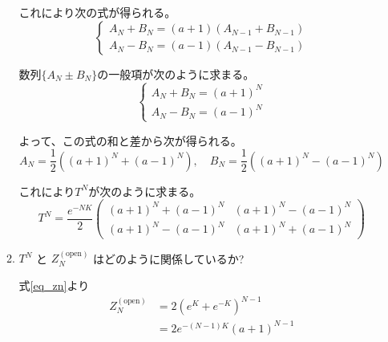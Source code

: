 \documentclass[12pt,b5paper]{ltjsarticle}
\begin{document}
\begin{enumerate}
\begin{enumerate}
      これにより次の式が得られる。
      \begin{equation}
       \begin{cases}
        A_{N}+ B_{N} = (a+1) (A_{N-1}+ B_{N-1})\\
        A_{N}- B_{N} = (a-1) \left( A_{N-1}- B_{N-1} \right)
       \end{cases}
      \end{equation}

      数列$\{A_{N} \pm B_{N}\}$の一般項が次のように求まる。
      \begin{equation}
       \begin{cases}
        A_{N}+ B_{N} = (a+1)^{N} \\
        A_{N}- B_{N} = (a-1)^{N}
       \end{cases}
      \end{equation}
      
      よって、この式の和と差から次が得られる。
      \begin{equation}
       A_{N} = \frac{1}{2}\left( (a+1)^{N} + (a-1)^{N} \right)
        ,\quad
       B_{N} = \frac{1}{2}\left( (a+1)^{N} - (a-1)^{N} \right)
      \end{equation}

      これにより$T^{N}$が次のように求まる。
      \begin{equation}
       T^{N} =
        \frac{e^{-NK}}{2}
        \begin{pmatrix}
         (a+1)^{N} + (a-1)^{N} & (a+1)^{N} - (a-1)^{N} \\
         (a+1)^{N} - (a-1)^{N} & (a+1)^{N} + (a-1)^{N}
        \end{pmatrix}
        \label{eq_tn}
      \end{equation}

      \hrulefill

       \item

            $T^{N}$
            と
            $Z^{(\mathrm{open})}_{N}$
            はどのように関係しているか?

            \dotfill

            式\eqref{eq_zn}より
            \begin{align}
             Z^{(\mathrm{open})}_{N}
              &= 2 (e^{K} + e^{-K})^{N-1}\\
              &= 2 e^{-(N-1)K} (a + 1)^{N-1}
            \end{align}


\end{enumerate}
\end{enumerate}
\end{document}
